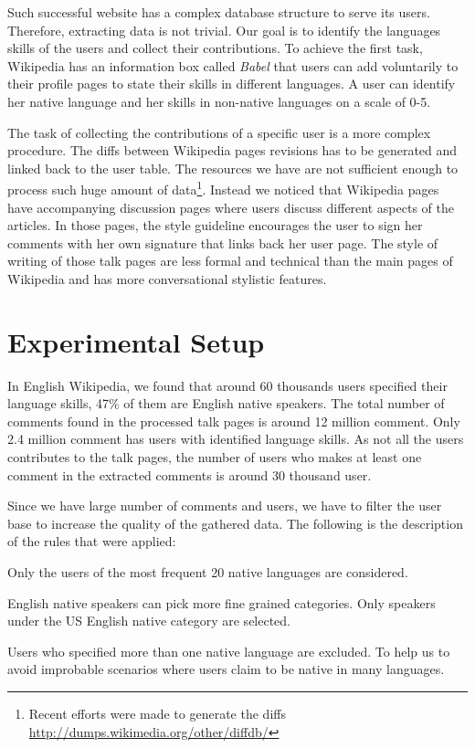 \documentclass[10pt,a5paper,twoside]{article}
\begin{document}
Such successful website has a complex database structure to serve its users.
Therefore, extracting data is not trivial. Our goal is to identify the
languages skills of the users and collect their contributions. To achieve the
first task, Wikipedia has an information box called \emph{Babel} that users can
add voluntarily to their profile pages to state their skills in different
languages. A user can identify her native language
and her skills in non-native languages on a scale of 0-5.

The task of collecting the contributions of a specific user is a more complex
procedure. The diffs between Wikipedia pages revisions has to be generated and
linked back to the user table. The resources we have are not sufficient enough to process such
huge amount of data\footnote{Recent efforts were
made to generate the diffs \url{http://dumps.wikimedia.org/other/diffdb/}}.
Instead we noticed that Wikipedia pages have accompanying discussion pages where
users discuss different aspects of the articles. In those pages, the style
guideline encourages the user to sign her comments with her own signature that
links back her user page. The style of writing of those
talk pages are less formal and technical than the main pages of Wikipedia and has more conversational stylistic features.

\section{Experimental Setup}
\label{setup}
In English Wikipedia, we found that around 60 thousands users specified their language skills, 47\% of
them are English native speakers. The total number of comments found in the
processed talk pages is around 12 million comment. Only 2.4 million comment has users with identified language skills. As not all the users contributes to the talk pages, the number of users who makes at least one comment in the extracted comments is around 30 thousand user.

Since we have large number of comments and users, we have to filter the user
base to increase the quality of the gathered data. The following is the
description of the rules that were applied:
\begin{compactitem}
\item Only the users of the most frequent 20 native languages are considered.
\item English native speakers can pick more fine grained categories. Only
  speakers under the US English native category are selected.
\item Users who specified more than one native language are excluded. To help
  us to avoid improbable scenarios where users claim to be native in many
languages.
\end{compactitem}
\end{document}
